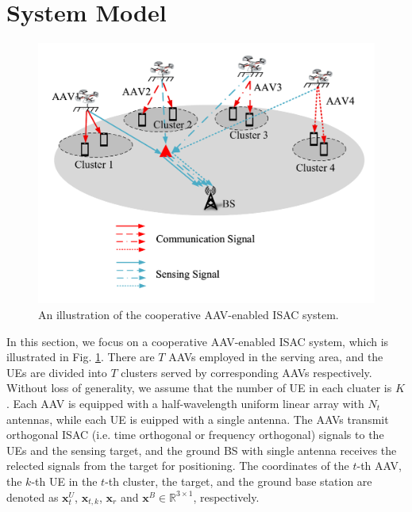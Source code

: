 \documentclass[twocolumn,journal]{IEEEtran}
\begin{document}
\section{System Model}
\begin{figure}[t]
    \centering
    \includegraphics[width = 0.99\linewidth]{figure/systemmodel.pdf}
    \caption{An illustration of the cooperative AAV-enabled ISAC system.}
    \label{fig:systemModel}
\end{figure}
In this section, we focus on a cooperative AAV-enabled ISAC system, which is illustrated in Fig. \ref{fig:systemModel}. There are \(T\) AAVs employed in the serving area, and the UEs are divided into \(T\) clusters served by corresponding AAVs respectively. Without loss of generality, we assume that the number of UE in each cluater is \(K\). Each AAV is equipped with a half-wavelength uniform linear array with \(N_t\) antennas, while each UE is euipped with a single antenna. The AAVs transmit orthogonal ISAC (i.e. time orthogonal or frequency orthogonal) signals to the UEs and the sensing target, and the ground BS with single antenna receives the relected signals from the target for positioning. The coordinates of the \(t\)-th AAV, the \(k\)-th UE in the \(t\)-th cluster, the target, and the ground base station are denoted as \(\boldsymbol{x}^{U}_{t}\), \(\boldsymbol{x}_{t,k}\), \(\boldsymbol{x}_{r}\) and \(\boldsymbol{x}^{B}\in \mathbb{R}^{3\times 1}\), respectively.
\end{document}
